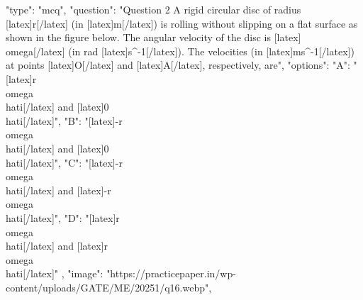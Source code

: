   {
    "type": "mcq",
    "question": "Question 2 A rigid circular disc of radius [latex]r[/latex] (in [latex]m[/latex]) is rolling without slipping on a flat surface as shown in the figure below. The angular velocity of the disc is [latex]\\omega[/latex] (in rad [latex]s^{-1}[/latex]). The velocities (in [latex]ms^{-1}[/latex]) at points [latex]O[/latex] and [latex]A[/latex], respectively, are",
    "options": {
      "A": "[latex]r\\omega \\hat{i}[/latex] and [latex]0 \\hat{i}[/latex]",
      "B": "[latex]-r\\omega \\hat{i}[/latex] and [latex]0 \\hat{i}[/latex]",
      "C": "[latex]-r\\omega \\hat{i}[/latex] and [latex]-r\\omega \\hat{i}[/latex]",
      "D": "[latex]r\\omega \\hat{i}[/latex] and [latex]r\\omega \\hat{i}[/latex]"
    },
    "image": "https://practicepaper.in/wp-content/uploads/GATE/ME/20251/q16.webp",
}

